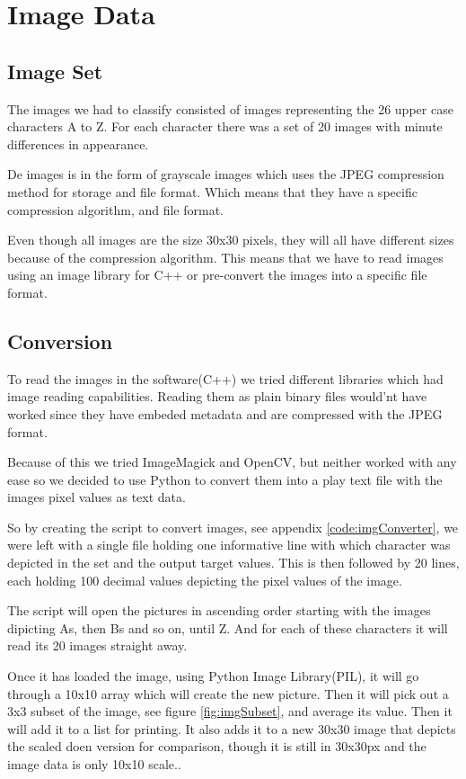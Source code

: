 \chapter{Image Data}

\section{Image Set}
The images we had to classify consisted of images representing the 26 upper case
characters A to Z. For each character there was a set of 20 images with minute
differences in appearance.

De images is in the form of grayscale images which uses the JPEG compression
method for storage and file format. Which means that they have a specific
compression algorithm, and file format.

Even though all images are the size 30x30 pixels, they will all have different
sizes because of the compression algorithm.  This means that we have to read
images using an image library for C++ or pre-convert the images into a specific
file format.


\section{Conversion}
To read the images in the software(C++) we tried different libraries which had
image reading capabilities. Reading them as plain binary files would'nt have
worked since they have embeded metadata and are compressed with the JPEG format.

Because of this we tried ImageMagick and OpenCV, but neither worked with any
ease so we decided to use Python to convert them into a play text file with the
images pixel values as text data.

So by creating the script to convert images, see appendix
\ref{code:imgConverter}, we were left with a single file holding one informative
line with which character was depicted in the set and the output target values.
This is then followed by 20 lines, each holding 100 decimal values depicting the
pixel values of the image.

The script will open the pictures in ascending order starting with the images
dipicting As, then Bs and so on, until Z. And for each of these characters it
will read its 20 images straight away.

Once it has loaded the image, using Python Image Library(PIL), it will go
through a 10x10 array which will create the new picture. Then it will pick out a
3x3 subset of the image, see figure \ref{fig:imgSubset}, and average its value.
Then it will add it to a list for printing. It also adds it to a new 30x30 image
that depicts the scaled doen version for comparison, though it is still in
30x30px and the image data is only 10x10 scale..




